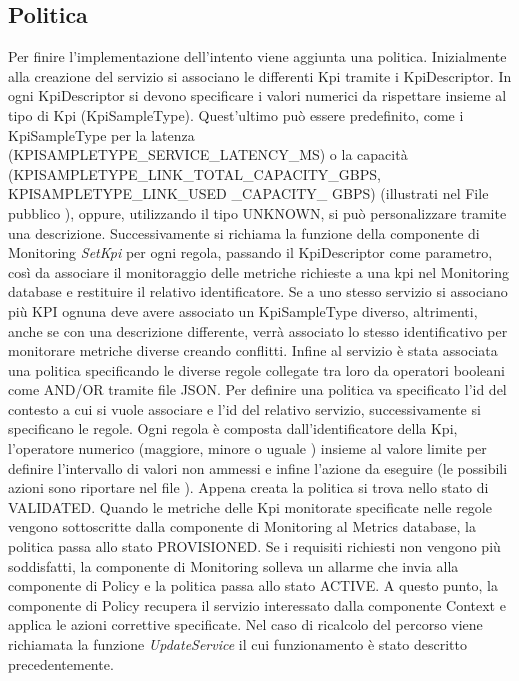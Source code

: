 \subsection{Politica}
Per finire l'implementazione dell'intento viene aggiunta una politica.
\newline Inizialmente alla creazione del servizio si associano le differenti Kpi tramite i KpiDescriptor.
In ogni KpiDescriptor  si devono specificare i valori numerici da rispettare insieme al tipo di Kpi (KpiSampleType).
Quest'ultimo può essere predefinito,
come i KpiSampleType per la latenza (KPISAMPLETYPE\_SERVICE\_LATENCY\_MS) o la capacità (KPISAMPLETYPE\_LINK\_TOTAL\_CAPACITY\_GBPS,  KPISAMPLETYPE\_LINK\_USED \_CAPACITY\_ GBPS) (illustrati nel File pubblico \cite{kpi}),
oppure, utilizzando il tipo UNKNOWN, si può personalizzare tramite una descrizione.
\newline Successivamente si richiama la funzione della componente di Monitoring \textit{SetKpi} per ogni regola, passando il KpiDescriptor come parametro, così da
associare il monitoraggio delle metriche richieste a una kpi nel Monitoring database e restituire il relativo identificatore.
Se a uno stesso servizio si associano più KPI ognuna deve avere associato un KpiSampleType diverso, altrimenti, anche se con una descrizione differente,
verrà associato lo stesso identificativo per monitorare metriche diverse creando conflitti. 
Infine al servizio è stata associata una politica specificando le diverse regole collegate tra loro da operatori booleani come AND/OR tramite file JSON.
Per definire una politica va specificato l'id del contesto a cui si vuole associare e l'id del relativo servizio, successivamente si specificano le regole.
Ogni regola è composta dall'identificatore della Kpi, l'operatore numerico (maggiore, minore o uguale \cite{op}) insieme al valore limite 
per definire l'intervallo di valori non ammessi e infine l'azione da eseguire (le possibili azioni sono riportare nel file \cite{az}).
Appena creata la politica si trova nello stato di VALIDATED. Quando le metriche delle Kpi monitorate
specificate nelle regole vengono sottoscritte dalla componente di Monitoring al Metrics database, la politica passa allo stato PROVISIONED.
Se i requisiti richiesti non vengono più soddisfatti, la componente di Monitoring solleva un allarme che invia alla componente di Policy
e la politica passa allo stato ACTIVE.
A questo punto, la componente di Policy recupera il servizio interessato dalla componente Context e applica le azioni correttive specificate.
Nel caso di ricalcolo del percorso viene richiamata la funzione \textit{UpdateService} il cui funzionamento è stato descritto precedentemente.
